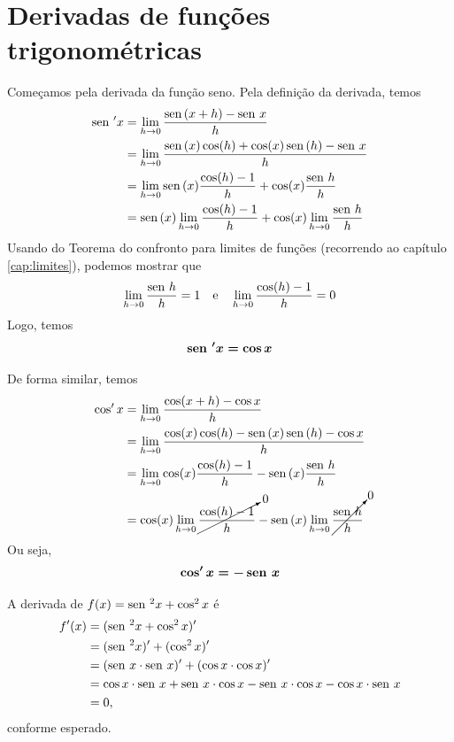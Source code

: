 \cleardoublepage\documentclass[../main.tex]{subfiles}
\begin{document}
\section{Derivadas de funções trigonométricas}\label{cap:deriv_func_trig}

Começamos pela derivada da função seno. Pela definição da derivada, temos
\begin{align*}
  \operatorname{sen}\,' x &= \lim_{h\to 0} \frac{\operatorname{sen}\,(x+h) - \operatorname{sen}\, x}{h} \\
            &= \lim_{h\to 0} \frac{\operatorname{sen}\,(x)\cos(h)+\cos(x)\operatorname{sen}\,(h) - \operatorname{sen}\, x}{h} \\
            &= \lim_{h\to 0} \operatorname{sen}\,(x)\frac{\cos(h) - 1}{h} + \cos(x)\frac{\operatorname{sen}\, h}{h}\\
            &= \operatorname{sen}\,(x) \lim_{h\to 0} \frac{\cos(h)-1}{h} + \cos(x)\lim_{h\to 0} \frac{\operatorname{sen}\, h}{h}
\end{align*}
Usando do Teorema do confronto para limites de funções (recorrendo ao capítulo \ref{cap:limites}), podemos mostrar que
\begin{equation}
  \lim_{h\to 0} \frac{\operatorname{sen}\, h}{h} = 1\quad\text{e}\quad\lim_{h\to 0} \frac{\cos(h) - 1}{h} = 0
\end{equation}
Logo, temos
\begin{equation}
  \boldsymbol{\operatorname{sen}\,' x = \cos x}
\end{equation}

De forma similar, temos
\begin{align*}
  \cos' x &= \lim_{h\to 0} \frac{\cos(x+h) - \cos x}{h} \\
            &= \lim_{h\to 0} \frac{\cos(x)\cos(h)-\operatorname{sen}\,(x)\operatorname{sen}\,(h) - \cos x}{h} \\
            &= \lim_{h\to 0} \cos(x)\frac{\cos(h) - 1}{h} - \operatorname{sen}\,(x)\frac{\operatorname{sen}\, h}{h}\\
            &= \cos(x) \lim_{h\to 0} \cancelto{0}{\frac{\cos(h)-1}{h}} - \operatorname{sen}\,(x)\lim_{h\to 0} \cancelto{0}{\frac{\operatorname{sen}\, h}{h}}
\end{align*}
Ou seja,
\begin{equation}
  \boldsymbol{\cos' x = -\operatorname{sen}\, x}
\end{equation}

\begin{ex}
  A derivada de $f(x) = \operatorname{sen}\,^2 x + \cos^2 x$ é
  \begin{align*}
    f'(x) &= (\operatorname{sen}\,^2x + \cos^2 x)' \\
          &= (\operatorname{sen}\,^2 x)' + (\cos^2 x)' \\
          &= (\operatorname{sen}\, x\cdot \operatorname{sen}\, x)' + (\cos x\cdot \cos x)' \\
          &= \cos x\cdot \operatorname{sen}\, x + \operatorname{sen}\, x\cdot\cos x -\operatorname{sen}\, x\cdot \cos x - \cos x\cdot\operatorname{sen}\, x\\
          &= 0,
  \end{align*}
  conforme esperado.
\end{ex}
\end{document}
